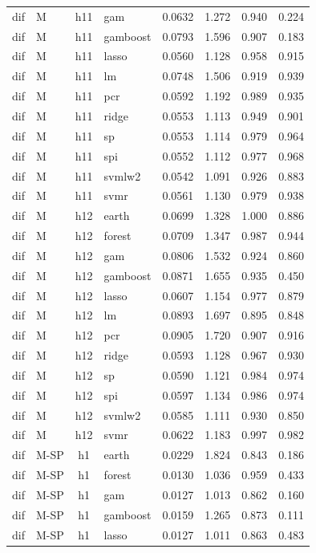 \begin{ThreePartTable}
\begin{longtable}[t]{llclcccc}
dif & M & h11 & gam & 0.0632 & 1.272 & 0.940 & 0.224\\
dif & M & h11 & gamboost & 0.0793 & 1.596 & 0.907 & 0.183\\
dif & M & h11 & lasso & 0.0560 & 1.128 & 0.958 & 0.915\\
dif & M & h11 & lm & 0.0748 & 1.506 & 0.919 & 0.939\\
dif & M & h11 & pcr & 0.0592 & 1.192 & 0.989 & 0.935\\
dif & M & h11 & ridge & 0.0553 & 1.113 & 0.949 & 0.901\\
dif & M & h11 & sp & 0.0553 & 1.114 & 0.979 & 0.964\\
dif & M & h11 & spi & 0.0552 & 1.112 & 0.977 & 0.968\\
dif & M & h11 & svmlw2 & 0.0542 & 1.091 & 0.926 & 0.883\\
dif & M & h11 & svmr & 0.0561 & 1.130 & 0.979 & 0.938\\
\addlinespace
dif & M & h12 & earth & 0.0699 & 1.328 & 1.000 & 0.886\\
dif & M & h12 & forest & 0.0709 & 1.347 & 0.987 & 0.944\\
dif & M & h12 & gam & 0.0806 & 1.532 & 0.924 & 0.860\\
dif & M & h12 & gamboost & 0.0871 & 1.655 & 0.935 & 0.450\\
dif & M & h12 & lasso & 0.0607 & 1.154 & 0.977 & 0.879\\
dif & M & h12 & lm & 0.0893 & 1.697 & 0.895 & 0.848\\
dif & M & h12 & pcr & 0.0905 & 1.720 & 0.907 & 0.916\\
dif & M & h12 & ridge & 0.0593 & 1.128 & 0.967 & 0.930\\
dif & M & h12 & sp & 0.0590 & 1.121 & 0.984 & 0.974\\
dif & M & h12 & spi & 0.0597 & 1.134 & 0.986 & 0.974\\
dif & M & h12 & svmlw2 & 0.0585 & 1.111 & 0.930 & 0.850\\
dif & M & h12 & svmr & 0.0622 & 1.183 & 0.997 & 0.982\\
\addlinespace
dif & M-SP & h1 & earth & 0.0229 & 1.824 & 0.843 & 0.186\\
dif & M-SP & h1 & forest & 0.0130 & 1.036 & 0.959 & 0.433\\
dif & M-SP & h1 & gam & 0.0127 & 1.013 & 0.862 & 0.160\\
dif & M-SP & h1 & gamboost & 0.0159 & 1.265 & 0.873 & 0.111\\
dif & M-SP & h1 & lasso & 0.0127 & 1.011 & 0.863 & 0.483\\

\end{longtable}
\end{ThreePartTable}
